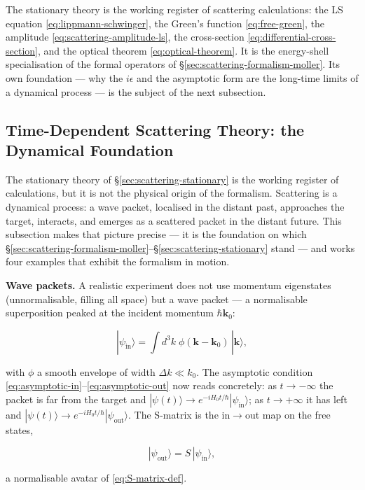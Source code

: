 The stationary theory is the working register of scattering calculations: the LS equation \eqref{eq:lippmann-schwinger}, the Green's function \eqref{eq:free-green}, the amplitude \eqref{eq:scattering-amplitude-ls}, the cross-section \eqref{eq:differential-cross-section}, and the optical theorem \eqref{eq:optical-theorem}. It is the energy-shell specialisation of the formal operators of \S\ref{sec:scattering-formalism-moller}. Its own foundation --- why the $i\epsilon$ and the asymptotic form are the long-time limits of a dynamical process --- is the subject of the next subsection.

\subsection{Time-Dependent Scattering Theory: the Dynamical Foundation}
\label{sec:scattering-timedep}

The stationary theory of \S\ref{sec:scattering-stationary} is the working register of calculations, but it is not the physical origin of the formalism. Scattering is a dynamical process: a wave packet, localised in the distant past, approaches the target, interacts, and emerges as a scattered packet in the distant future. This subsection makes that picture precise --- it is the foundation on which \S\ref{sec:scattering-formalism-moller}--\S\ref{sec:scattering-stationary} stand --- and works four examples that exhibit the formalism in motion.

\medskip\noindent\textbf{Wave packets.} A realistic experiment does not use momentum eigenstates (unnormalisable, filling all space) but a wave packet --- a normalisable superposition peaked at the incident momentum $\hbar\bm k_{0}$:
\begin{linenomath}
\begin{equation}
|\psi_{\mathrm{in}}\rangle = \int d^{3}k\;\phi(\bm k-\bm k_{0})\,|\bm k\rangle,
\label{eq:wave-packet-in}
\end{equation}
\end{linenomath}
with $\phi$ a smooth envelope of width $\Delta k\ll k_{0}$. The asymptotic condition \eqref{eq:asymptotic-in}--\eqref{eq:asymptotic-out} now reads concretely: as $t\to-\infty$ the packet is far from the target and $|\psi(t)\rangle\to e^{-iH_{0}t/\hbar}|\psi_{\mathrm{in}}\rangle$; as $t\to+\infty$ it has left and $|\psi(t)\rangle\to e^{-iH_{0}t/\hbar}|\psi_{\mathrm{out}}\rangle$. The S-matrix is the in$\to$out map on the free states,
\begin{linenomath}
\begin{equation}
|\psi_{\mathrm{out}}\rangle = S\,|\psi_{\mathrm{in}}\rangle,
\label{eq:S-matrix-wave-packet}
\end{equation}
\end{linenomath}
a normalisable avatar of \eqref{eq:S-matrix-def}.

